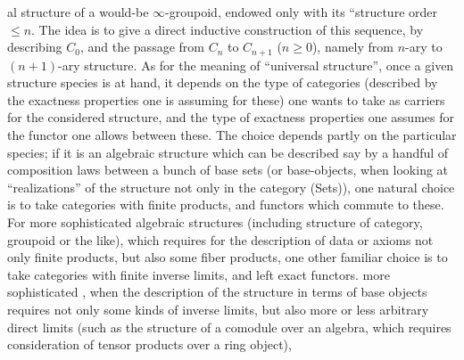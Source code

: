 %
%
al structure of a would-be $\infty$-groupoid, endowed only with its ``structure order $\leq n$. The idea is to give a direct inductive construction of this sequence, by describing $C_0$, and the passage from $C_n$ to $C_{n+1}$ ($n\geq0$), namely from $n$-ary to $(n+1)$-ary structure. As for the meaning of ``universal structure'',  once a given structure species is at hand, it depends on the type of categories (described by the exactness properties one is assuming for these) one wants to take as carriers for the considered structure, and the type of exactness properties one assumes for the functor one allows between these. The choice depends partly on the particular species; if it is an algebraic structure which can be described say by a handful of composition laws between a bunch of base sets (or base-objects, when looking at ``realizations'' of the structure not only in the category (Sets)), one natural choice is to take categories with finite products, and functors which commute to these. For more sophisticated algebraic structures (including structure of category, groupoid or the like), which requires for the description of data or axioms not only finite products, but also some fiber products, one other familiar choice is to take categories with finite inverse limits, and left exact functors.  more sophisticated , when the description of the structure in terms of base objects requires not only some kinds of inverse limits, but also more or less arbitrary direct limits (such as the structure of a comodule over an algebra, which requires consideration of tensor products over a ring object),%
